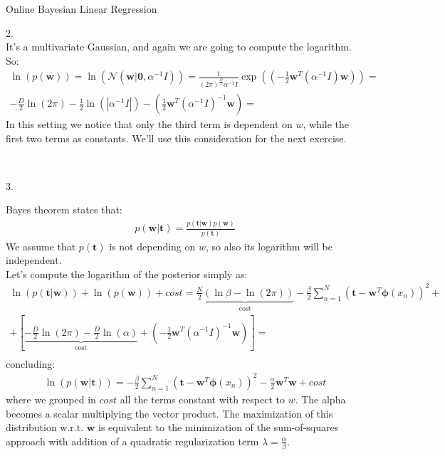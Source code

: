 \documentclass[english]{exercisesheet}
\begin{document}
\begin{nexercise}{Online Bayesian Linear Regression}
  \par 
  \begin{solution} 2.
  \\ It's a multivariate Gaussian, and again we are going to compute the logarithm. So:
  \begin{align*}
  \ln(p(\bm{w})) = \ln(\mathcal{N}(\bm {w} | \bm {0}, \alpha^{-1}I)) =  \frac{1}{(2\pi)^{\frac{D}{2}}\alpha^{-1}I}\exp\left((-\frac{1}{2}\bm{w}^{T}(\alpha^{-1}I)\bm{w})\right) = \\ -\frac{D}{2}\ln(2\pi)-\frac{1}{2}\ln(|\alpha^{-1}I|)-\left(\frac{1}{2}\bm{w}^{T}(\alpha^{-1}I)^{-1}\bm{w}\right) = 
  \end{align*}
  In this setting we notice that only the third term is dependent on $w$, while the first two terms as constants. We'll use this consideration for the next exercise.
    \end{solution}\\
    \begin{solution} 3.
  \par 
  Bayes theorem states that:
  \begin{align*}
  p(\bm{w}|\bm{t}) = \frac{p(\bm{t}|\bm{w})p(\bm{w})}{p(\bm{t})}
  \end{align*}
  We assume that $p(\bm t)$ is not depending on $w$, so also its logarithm will be independent. \\ Let's compute the logarithm of the posterior simply as:
  \begin{align*}
      \ln(p(\bm{t}|\bm{w}))+ \ln(p(\bm{w})) + cost = \underbrace{\frac{N}{2}\left(\ln\beta-\ln(2\pi)\right)}_\text{cost} - \frac{\beta}{2}\sum_{n=1}^{N}(\bm{t}-\bm{w}^{T}\bm{\phi}(x_{n}))^{2} + \\ + \left[\underbrace{-\frac{D}{2}\ln(2\pi)-\frac{D}{2}\ln(\alpha)}_\text{cost}+\left(-\frac{1}{2}\bm{w}^{T}(\alpha^{-1}I)^{-1}\bm{w}\right)\right] = \\
      \end{align*}
      concluding:
     \begin{align*}
      \ln(p(\bm{w}|\bm{t})) = -\frac{\beta}{2}\sum_{n=1}^{N}(\bm{t}-\bm{w}^{T}\bm{\phi}(x_{n}))^{2}-\frac{\alpha}{2}\bm{w}^{T}\bm{w} + cost
    \end{align*}
    where we grouped in $cost$ all the terms constant with respect to $w$. The alpha becomes a scalar multiplying the vector product.
    The maximization of this distribution w.r.t. $\bm{w}$ is equivalent to the minimization of the sum-of-squares approach with addition of a quadratic regularization term $\lambda = \frac{\alpha}{\beta}$. \\

\end{solution}
\end{nexercise}
\end{document}

